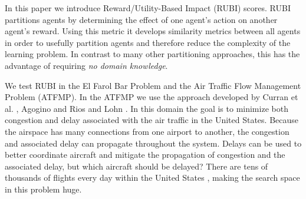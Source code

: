 \documentclass[letterpaper]{article}
\begin{document}
In this paper we introduce Reward/Utility-Based Impact (RUBI) scores. RUBI partitions agents by determining the effect of one agent's action on another agent's reward. Using this metric it develops similarity metrics between all agents in order to usefully partition agents and therefore reduce the complexity of the learning problem. In contrast to many other partitioning approaches, this has the advantage of requiring \textit{no domain knowledge}.

We test RUBI in the El Farol Bar Problem \cite{BarProblem} and the Air Traffic Flow Management Problem (ATFMP). In the ATFMP we use the approach developed by Curran et al. , Agogino  and Rios and Lohn . In this domain the goal is to minimize both congestion and delay associated with the air traffic in the United States. Because the airspace has many connections from one airport to another, the congestion and associated delay can propagate throughout the system. Delays can be used to better coordinate aircraft and mitigate the propagation of congestion and the associated delay, but which aircraft should be delayed? There are tens of thousands of flights every day within the United States \cite{faa05}, making the search space in this problem huge.


 
\end{document}
